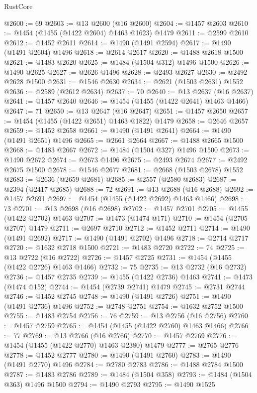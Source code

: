\begin{lexlean}{RustCore}
\begin{coremodule}
@2600 := 69
@2603 := @13 @2600 (@16 @2600)
@2604 := @1457 @2603
@2610 := @1454 (@1455 (@1422 @2604) @1463 @1623) @1479
@2611 := @2599 @2610
@2612 := @1452 @2611
@2614 := @1490 (@1491 @2594)
@2617 := @1490 (@1491 @2604) @1496
@2618 := @2614 @2617
@2620 := @1488 @2618 @1500
@2621 := @1483 @2620
@2625 := @1484 (@1504 @312) @1496 @1500
@2626 := @1490 @2625
@2627 := @2626 @1496
@2628 := @2493 @2627
@2630 := @2492 @2628 @1500
@2631 := @1546 @2630
@2634 := @2621 (@1503 @2631) @1552
@2636 := @2589 (@2612 @2634)
@2637 := 70
@2640 := @13 @2637 (@16 @2637)
@2641 := @1457 @2640
@2646 := @1454 (@1455 (@1422 @2641) @1463 @1466)
@2647 := 71
@2650 := @13 @2647 (@16 @2647)
@2651 := @1457 @2650
@2657 := @1454 (@1455 (@1422 @2651) @1463 @1822) @1479
@2658 := @2646 @2657
@2659 := @1452 @2658
@2661 := @1490 (@1491 @2641)
@2664 := @1490 (@1491 @2651) @1496
@2665 := @2661 @2664
@2667 := @1488 @2665 @1500
@2668 := @1483 @2667
@2672 := @1484 (@1504 @327) @1496 @1500
@2673 := @1490 @2672
@2674 := @2673 @1496
@2675 := @2493 @2674
@2677 := @2492 @2675 @1500
@2678 := @1546 @2677
@2681 := @2668 (@1503 @2678) @1552
@2683 := @2636 (@2659 @2681)
@2685 := @2557 (@2580 @2683)
@2687 := @2394 (@2417 @2685)
@2688 := 72
@2691 := @13 @2688 (@16 @2688)
@2692 := @1457 @2691
@2697 := @1454 (@1455 (@1422 @2692) @1463 @1466)
@2698 := 73
@2701 := @13 @2698 (@16 @2698)
@2702 := @1457 @2701
@2705 := @1455 (@1422 @2702) @1463
@2707 := @1473 (@1474 @171)
@2710 := @1454 (@2705 @2707) @1479
@2711 := @2697 @2710
@2712 := @1452 @2711
@2714 := @1490 (@1491 @2692)
@2717 := @1490 (@1491 @2702) @1496
@2718 := @2714 @2717
@2720 := @1632 @2718 @1500
@2721 := @1483 @2720
@2722 := 74
@2725 := @13 @2722 (@16 @2722)
@2726 := @1457 @2725
@2731 := @1454 (@1455 (@1422 @2726) @1463 @1466)
@2732 := 75
@2735 := @13 @2732 (@16 @2732)
@2736 := @1457 @2735
@2739 := @1455 (@1422 @2736) @1463
@2741 := @1473 (@1474 @152)
@2744 := @1454 (@2739 @2741) @1479
@2745 := @2731 @2744
@2746 := @1452 @2745
@2748 := @1490 (@1491 @2726)
@2751 := @1490 (@1491 @2736) @1496
@2752 := @2748 @2751
@2754 := @1632 @2752 @1500
@2755 := @1483 @2754
@2756 := 76
@2759 := @13 @2756 (@16 @2756)
@2760 := @1457 @2759
@2765 := @1454 (@1455 (@1422 @2760) @1463 @1466)
@2766 := 77
@2769 := @13 @2766 (@16 @2766)
@2770 := @1457 @2769
@2776 := @1454 (@1455 (@1422 @2770) @1463 @2380) @1479
@2777 := @2765 @2776
@2778 := @1452 @2777
@2780 := @1490 (@1491 @2760)
@2783 := @1490 (@1491 @2770) @1496
@2784 := @2780 @2783
@2786 := @1488 @2784 @1500
@2787 := @1483 @2786
@2789 := @1484 (@1504 @358)
@2793 := @1484 (@1504 @363) @1496 @1500
@2794 := @1490 @2793
@2795 := @1490 @1525

\end{coremodule}
\end{lexlean}
